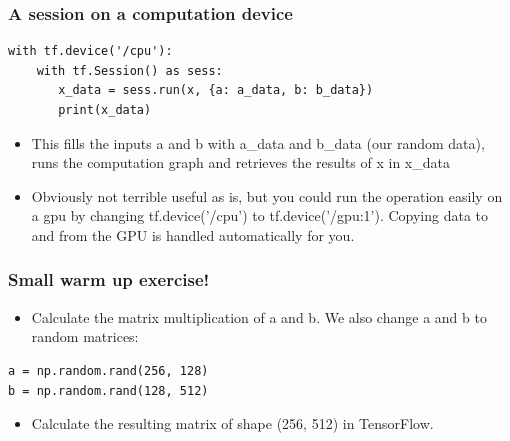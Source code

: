 \documentclass{beamer}
\begin{document}
\begin{frame}[fragile]
\frametitle{A session on a computation device}

\begin{lstlisting}
with tf.device('/cpu'):
    with tf.Session() as sess:
       x_data = sess.run(x, {a: a_data, b: b_data})  
       print(x_data)
\end{lstlisting}

\begin{itemize}
\item This fills the inputs a and b with a\_data and b\_data (our random data), runs the computation graph and retrieves the results of x in x\_data
\item Obviously not terrible useful as is, but you could run the operation easily on a gpu by changing tf.device('/cpu') to  tf.device('/gpu:1'). Copying data to and from the GPU is handled automatically for you.
\end{itemize}

\end{frame} 

\begin{frame}[fragile]
\frametitle{Small warm up exercise!}

\begin{itemize}
	\item Calculate the matrix multiplication of a and b. We also change a and b to random matrices:
\end{itemize}

\begin{lstlisting}
a = np.random.rand(256, 128)
b = np.random.rand(128, 512)
\end{lstlisting}

\begin{itemize}
	\item Calculate the resulting matrix of shape (256, 512) in TensorFlow.
\end{itemize}

\end{frame} 
\end{document}
